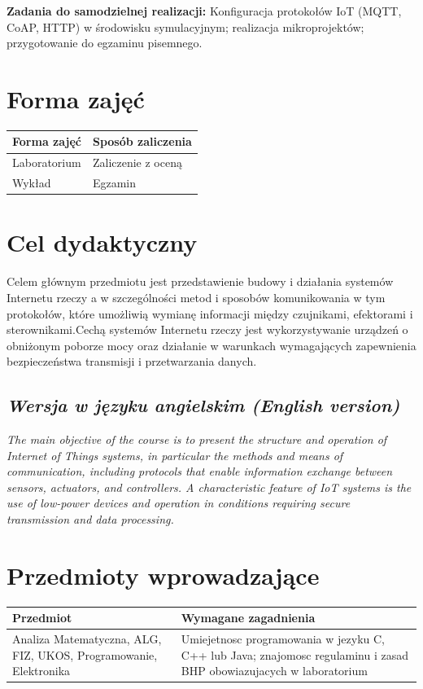 \documentclass[12pt, a4paper]{article}
\begin{document}
\vspace{4pt}
\noindent\textbf{Zadania do samodzielnej realizacji:} Konfiguracja protokołów IoT (MQTT, CoAP, HTTP) w środowisku symulacyjnym; realizacja mikroprojektów; przygotowanie do egzaminu pisemnego.

\section{Forma zajęć}

\begin{tabular}{ll}
  \hline
  \textbf{Forma zajęć} & \textbf{Sposób zaliczenia} \\
  \hline
  Laboratorium & Zaliczenie z oceną \\
  Wykład & Egzamin \\
  \hline
\end{tabular}

\section{Cel dydaktyczny}

Celem głównym przedmiotu jest przedstawienie budowy i działania systemów Internetu rzeczy a w szczególności metod i sposobów komunikowania w tym protokołów, które umożliwią wymianę informacji między czujnikami, efektorami i sterownikami.Cechą systemów Internetu rzeczy jest wykorzystywanie urządzeń o obniżonym poborze mocy oraz działanie w warunkach wymagających zapewnienia bezpieczeństwa transmisji i przetwarzania danych.

\subsection*{\textit{Wersja w języku angielskim (English version)}}

\textit{The main objective of the course is to present the structure and operation of Internet of Things systems, in particular the methods and means of communication, including protocols that enable information exchange between sensors, actuators, and controllers. A characteristic feature of IoT systems is the use of low-power devices and operation in conditions requiring secure transmission and data processing.}


\section{Przedmioty wprowadzające}

\begin{tabularx}{\textwidth}{lX}
  \hline
  \textbf{Przedmiot} & \textbf{Wymagane zagadnienia} \\
  \hline
  Analiza Matematyczna, ALG, FIZ, UKOS, Programowanie, Elektronika & Umiejetnosc programowania w jezyku C, C++ lub Java; znajomosc regulaminu i zasad BHP obowiazujacych w laboratorium \\
  \hline
\end{tabularx}
\end{document}
